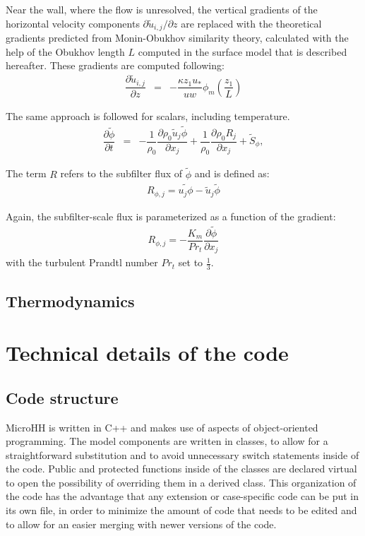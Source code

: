 \documentclass[gmd]{copernicus}
\newcommand{\uf}{\ensuremath{\widetilde{u}}}
\newcommand{\phif}{\ensuremath{\widetilde{\phi}}}
\begin{document}
Near the wall, where the flow is unresolved, the vertical gradients of the horizontal velocity components $\partial \uf_{i,j}/\partial z$ are replaced with the theoretical gradients predicted from Monin-Obukhov similarity theory, calculated with the help of the Obukhov length $L$ computed in the surface model that is described hereafter. These gradients are computed following:
\begin{eqnarray}
\dfrac{\partial \uf_{i,j}}{\partial z} & = & -\dfrac{\kappa z_1 u_*}{uw} \phi_m \left( \dfrac{z_1}{L} \right)
\end{eqnarray}

The same approach is followed for scalars, including temperature. 
\begin{eqnarray}
\dfrac{\partial \phif}{\partial t} & = & - \dfrac{1}{\rho_0} \dfrac{\partial \rho_0 \uf_j \phif}{\partial x_j} + \dfrac{1}{\rho_0} \dfrac{\partial \rho_0 R_j}{\partial x_j} + \widetilde{S}_\phi, \label{eq:consscal}
\end{eqnarray}

The term $R$ refers to the subfilter flux of $\phif$ and is defined as:
\begin{eqnarray}
R_{\phi,j} = \widetilde{u_j \phi} - \uf_j \phif
\end{eqnarray}

Again, the subfilter-scale flux is parameterized as a function of the gradient:
\begin{eqnarray}
R_{\phi,j} = - \dfrac{K_m}{Pr_t} \dfrac{\partial \phif}{\partial x_j}
\end{eqnarray}
with the turbulent Prandtl number $Pr_t$ set to $\frac{1}{3}$.

\subsection{Thermodynamics}

\section{Technical details of the code}\label{sec:technical}
\subsection{Code structure}
MicroHH is written in C++ and makes use of aspects of object-oriented programming. The model components are written in classes, to allow for a straightforward substitution and to avoid unnecessary switch statements inside of the code. Public and protected functions inside of the classes are declared virtual to open the possibility of overriding them in a derived class. This organization of the code has the advantage that any extension or case-specific code can be put in its own file, in order to minimize the amount of code that needs to be edited and to allow for an easier merging with newer versions of the code.
\end{document}
